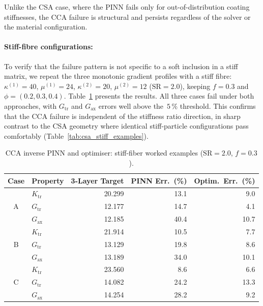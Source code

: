 \documentclass[oneside, 12pt, a4paper, bibliography=totoc]{book}
\begin{document}
Unlike the CSA case, where the PINN fails only for out-of-distribution coating stiffnesses, the CCA failure is structural and persists regardless of the solver or the material configuration.

\paragraph{Stiff-fibre configurations:}
To verify that the failure pattern is not specific to a soft inclusion in a stiff matrix, we repeat the three monotonic gradient profiles with a stiff fibre: $\kappa^{(1)} = 40$, $\mu^{(1)} = 24$, $\kappa^{(2)} = 20$, $\mu^{(2)} = 12$ ($\text{SR} = 2.0$), keeping $f = 0.3$ and $\phi = (0.2, 0.3, 0.4)$. Table~\ref{tab:cca_stiff_examples} presents the results. All three cases fail under both approaches, with $G_{\text{tr}}$ and $G_{\text{ax}}$ errors well above the~$5\,\%$ threshold. This confirms that the CCA failure is independent of the stiffness ratio direction, in sharp contrast to the CSA geometry where identical stiff-particle configurations pass comfortably (Table~\ref{tab:csa_stiff_examples}).

\begin{table}[htbp]
\centering
\caption{CCA inverse PINN and optimiser: stiff-fiber worked examples ($\text{SR}=2.0$, $f=0.3$).}
\label{tab:cca_stiff_examples}
{\footnotesize
\begin{tabular}{c l r r r}
\toprule
Case & Property & 3-Layer Target & PINN Err.~(\%) & Optim.\ Err.~(\%) \\
\midrule
\multirow{3}{*}{A}
 & $K_{\text{tr}}$  & 20.299 & 13.1  & 9.0 \\
 & $G_{\text{tr}}$  & 12.177 & 14.7 & 4.1 \\
 & $G_{\text{ax}}$  & 12.185 & 40.4 & 10.7 \\
\midrule
\multirow{3}{*}{B}
 & $K_{\text{tr}}$  & 21.914 & 10.5  & 7.7 \\
 & $G_{\text{tr}}$  & 13.129 & 19.8 & 8.6 \\
 & $G_{\text{ax}}$  & 13.189 & 34.0 & 10.1 \\
\midrule
\multirow{3}{*}{C}
 & $K_{\text{tr}}$  & 23.560 & 8.6  & 6.6 \\
 & $G_{\text{tr}}$  & 14.082 & 24.2 & 13.3 \\
 & $G_{\text{ax}}$  & 14.254 & 28.2 & 9.2 \\
\bottomrule
\end{tabular}
}
\end{table}
\end{document}
